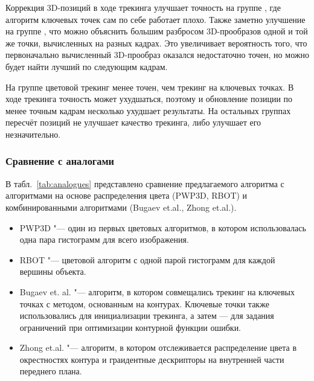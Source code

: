 Коррекция 3D-позиций в ходе трекинга улучшает точность на группе , где алгоритм ключевых точек сам по себе работает плохо.
Также заметно улучшение на группе , что можно объяснить
большим разбросом 3D-прообразов одной и той же точки, вычисленных на разных
кадрах.
Это увеличивает вероятность того, что первоначально вычисленный 3D-прообраз
оказался недостаточно точен, но можно будет найти лучший по следующим кадрам.

На группе  цветовой трекинг менее точен, чем трекинг на ключевых
точках.
В ходе трекинга точность может ухудшаться, поэтому и обновление позиции по
менее точным кадрам несколько ухудшает результаты.
На остальных группах пересчёт позиций не улучшает качество трекинга, либо
улучшает его незначительно.


\subsubsection{Сравнение с аналогами}

В табл.~\ref{tab:analogues} представлено сравнение предлагаемого алгоритма с алгоритмами на основе распределения цвета (PWP3D, RBOT) и комбинированными алгоритмами (Bugaev et.al., Zhong et.al.). 

\begin{itemize}
    \item PWP3D "--- один из первых цветовых алгоритмов, в котором использовалась одна пара гистограмм для всего изображения.
    \item RBOT "--- цветовой алгоритм с одной парой гистограмм для каждой вершины объекта. 
    \item Bugaev et. al. "--- алгоритм, в котором совмещались трекинг на ключевых точках с методом, основанным на контурах. Ключевые точки также использовались для инициализации трекинга, а затем --- для задания ограничений при оптимизации контурной функции ошибки.
    \item Zhong et.al. "--- алгоритм, в котором отслеживается распределение цвета в окрестностях контура и граидентные дескрипторы на внутренней части переднего плана.
\end{itemize}

